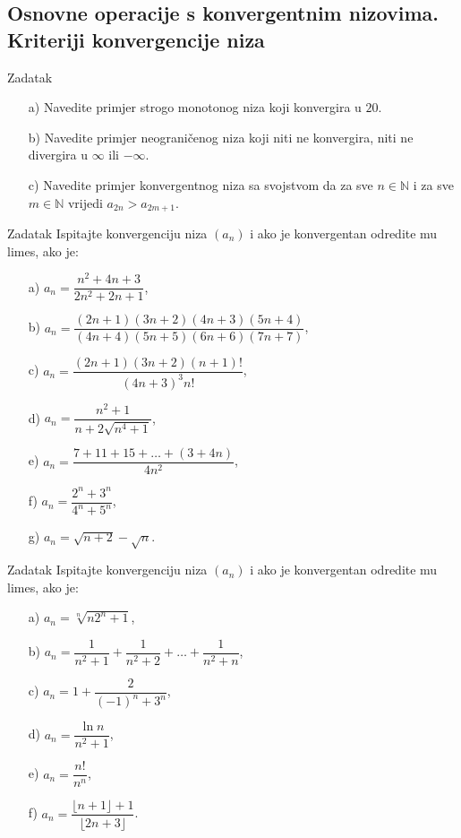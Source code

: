 \subsection*{Osnovne operacije s konvergentnim nizovima. Kriteriji konvergencije niza}
\begin{exercise}{Zadatak} \textbf{}
\begin{itemize}
\item[a)] Navedite primjer strogo monotonog niza koji konvergira u \(20\).
\item[b)] Navedite primjer neograničenog niza koji niti ne konvergira, niti ne divergira u \(\infty\) ili \(-\infty\).
\item[c)] Navedite primjer konvergentnog niza sa svojstvom da za sve \(n\in \mathbb{N}\) i za sve \(m\in \mathbb{N}\) vrijedi \(a_{2n}>a_{2m+1}\).
\end{itemize}
\end{exercise}
\begin{exercise}{Zadatak}
Ispitajte konvergenciju niza \((a_n)\) i ako je konvergentan odredite mu limes, ako je: 
\begin{multicols}{2}
\begin{itemize}
\item[a)] \(a_n=\dfrac{n^2+4n+3}{2n^2+2n+1}\),
\item[b)] \(a_n=\dfrac{(2n+1)(3n+2)(4n+3)(5n+4)}{(4n+4)(5n+5)(6n+6)(7n+7)}\),
\item[c)] \(a_n=\dfrac{(2n+1)(3n+2)(n+1)!}{(4n+3)^3n!}\),
\item[d)] \(a_n=\dfrac{n^2+1}{n+2\sqrt{n^4+1}}\),
\item[e)] \(a_n=\dfrac{7+11+15+\dots+(3+4n)}{4n^2}\),
\item[f)] \(a_n=\dfrac{2^n+3^n}{4^n+5^n}\),
\item[g)] \(a_n=\sqrt{n+2}-\sqrt{n}\).
\end{itemize}
\end{multicols}
\end{exercise}
\begin{exercise}{Zadatak} Ispitajte konvergenciju niza \((a_n)\) i ako je konvergentan odredite mu limes, ako je:
\begin{multicols}{2}
\begin{itemize}
\item[a)] \(a_n=\sqrt[n]{n2^n+1}\),
\item[b)] \(a_n=\dfrac{1}{n^2+1}+\dfrac{1}{n^2+2}+\dots+\dfrac{1}{n^2+n}\),
\item[c)] \(a_n=1+\dfrac{2}{(-1)^n+3^n}\),
\item[d)] \(a_n=\dfrac{\ln{n}}{n^2+1}\),
\item[e)] \(a_n=\dfrac{n!}{n^n}\),
\item[f)] \(a_n=\dfrac{\lfloor n+1\rfloor+1}{\lfloor 2n+3\rfloor}\).
\end{itemize}
\end{multicols}
\end{exercise}
